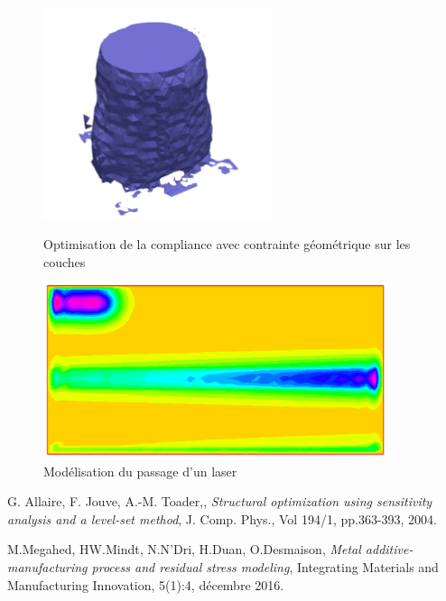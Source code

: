 \documentclass[10pt]{article}
\begin{document}
\begin{figure}[h]
	\begin{minipage}{0.45\textwidth}
		\centering
		\includegraphics[width=0.6\textwidth]{tour}
		\caption{Optimisation de la compliance avec contrainte g\'eom\'etrique sur les couches}
	\end{minipage}
	\begin{minipage}{0.45\textwidth}
			\centering
			\includegraphics[width=0.9\textwidth]{temp}
			\caption{Mod\'elisation du passage d'un laser}
	\end{minipage}	
\end{figure}

\begin{thebibliography}{99}

 {\sc G. Allaire, F. Jouve, A.-M. Toader,}, {\sl Structural optimization using sensitivity analysis and a level-set method}, J. Comp. Phys., Vol 194/1, pp.363-393, 2004.

 {\sc M.Megahed, HW.Mindt, N.N’Dri, H.Duan, O.Desmaison}, {\sl Metal additive-manufacturing process and residual stress modeling}, Integrating Materials and Manufacturing Innovation, 5(1):4, décembre 2016.

\end{thebibliography}
\end{document}
